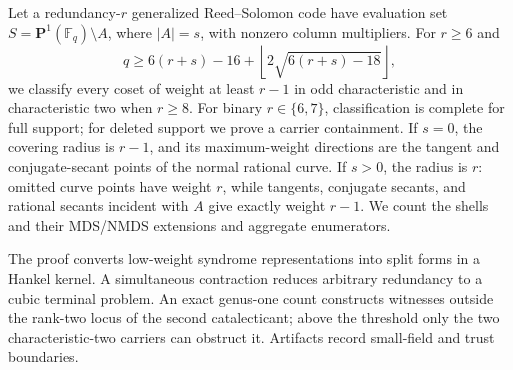 Let a redundancy-\(r\) generalized Reed--Solomon code have evaluation set
\(S=\mathbf P^1(\mathbb F_q)\setminus A\), where \(|A|=s\), with nonzero
column multipliers.  For \(r\geq6\) and
\[
q\geq6(r+s)-16+\left\lfloor2\sqrt{6(r+s)-18}\right\rfloor,
\]
we classify every coset of weight at least \(r-1\) in odd characteristic and
in characteristic two when \(r\geq8\).  For binary \(r\in\{6,7\}\),
classification is complete for full support; for deleted support we prove
a carrier containment.  If \(s=0\), the covering
radius is \(r-1\), and its maximum-weight directions are the tangent and
conjugate-secant points of the normal rational curve.  If \(s>0\), the radius
is \(r\): omitted curve points have weight \(r\), while tangents, conjugate
secants, and rational secants incident with \(A\) give exactly weight \(r-1\).
We count the shells and their MDS/NMDS extensions and aggregate enumerators.

The proof converts low-weight syndrome representations into split forms in a
Hankel kernel.  A simultaneous contraction reduces arbitrary redundancy to a
cubic terminal problem.  An exact genus-one count constructs witnesses outside
the rank-two locus of the second catalecticant; above the threshold only the
two characteristic-two carriers can obstruct it.  Artifacts record small-field
and trust boundaries.
